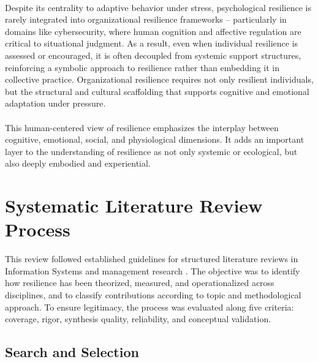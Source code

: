 \\
Despite its centrality to adaptive behavior under stress, psychological resilience is rarely integrated into organizational resilience frameworks -- particularly in domains like cybersecurity, where human cognition and affective regulation are critical to situational judgment. As a result, even when individual resilience is assessed or encouraged, it is often decoupled from systemic support structures, reinforcing a symbolic approach to resilience rather than embedding it in collective practice. Organizational resilience requires not only resilient individuals, but the structural and cultural scaffolding that supports cognitive and emotional adaptation under pressure.\\
\\
This human-centered view of resilience emphasizes the interplay between cognitive, emotional, social, and physiological dimensions. It adds an important layer to the understanding of resilience as not only systemic or ecological, but also deeply embodied and experiential.


\section{Systematic Literature Review Process}
\label{appendix:B}

This review followed established guidelines for structured literature reviews in Information Systems and management research \autocite{webster2002analyzing, vomBrocke2009, vombrocke2015standing}. The objective was to identify how resilience has been theorized, measured, and operationalized across disciplines, and to classify contributions according to topic and methodological approach. To ensure legitimacy, the process was evaluated along five criteria: coverage, rigor, synthesis quality, reliability, and conceptual validation.  

\subsection{Search and Selection}

